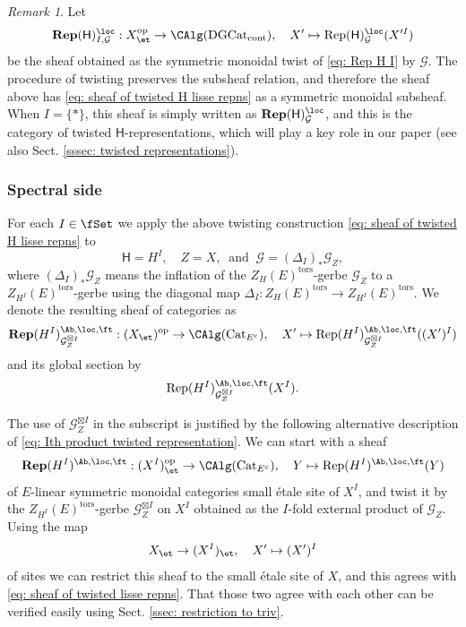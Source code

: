 \documentclass[10pt]{amsart}
\newcommand{\sssec}{\subsubsection}
\theoremstyle{remark}
\newtheorem{rmk}[subsubsection]{Remark}
\newcommand{\te}{\text}
\newcommand{\on}{\operatorname}
\newcommand{\cG}{\mathcal{G}}
\newcommand{\Cat}{\on{Cat}}
\newcommand{\CatEc}{\Cat_{E^c}}
\newcommand{\DGcat}{\on{DGCat}_{\on{cont}}}
\newcommand{\Rep}{\on{Rep}}
\DeclareMathOperator{\op}{op}
\begin{document}
\begin{rmk}\label{rmk: twisted Rep H containing twisted Rep H lisse}
    Let 
    \begin{equation*}
       \mathbf{Rep}(\mathsf{H})^{\loc}_{I,\cG}: X^{\op}_{\et}\rightarrow \CAlg(\DGcat),\quad X'\mapsto \Rep(\mathsf{H})^{\loc}_{\cG}(X'^I) 
    \end{equation*}
    be the sheaf obtained as the symmetric monoidal twist of \eqref{eq: Rep H I} by $\cG$.
    The procedure of twisting preserves the subsheaf relation, and therefore the sheaf above has \eqref{eq: sheaf of twisted H lisse repns} as a symmetric monoidal subsheaf. When $I=\{*\}$, this sheaf is simply written as $\mathbf{Rep}(\mathsf{H})^{\loc}_{\cG}$, and this is the category of twisted $\mathsf{H}$-representations, which will play a key role in our paper (see also Sect. \ref{sssec: twisted representations}).
\end{rmk}

\sssec{Spectral side}\label{sssec: B side of Satake}
For each $I\in\fSet$ we apply the above twisting construction \eqref{eq: sheaf of twisted H lisse repns} to
\[\mathsf{H}=H^I,\quad Z=X,\ \te{ and } \ \cG=(\Delta_I)_*\cG_Z,\]
 where $(\Delta_I)_*\cG_Z$ means the inflation of the $Z_H(E)^{\on{tors}}$-gerbe $\cG_Z$ to a $Z_{H^I}(E)^{\on{tors}}$-gerbe using the diagonal map $\Delta_I:Z_H(E)^{\on{tors}}\rightarrow Z_{H^I}(E)^{\on{tors}}$. We denote the resulting sheaf of categories as
\begin{equation}\label{eq: sheaf of twisted lisse repns}
\mathbf{Rep}(H^I)^{\Ab,\loc,\ft}_{\cG^{\boxtimes I}_Z}: (X_{\et})^{\op}\rightarrow \CAlg(\CatEc),\quad X'\mapsto \Rep(H^I)^{\Ab,\loc,\ft}_{\cG_Z^{\boxtimes I}}((X')^I)
\end{equation}
and its global section by 
\begin{equation}\label{eq: Ith product twisted representation}
    \Rep(H^I)^{\Ab,\loc,\ft}_{\cG^{\boxtimes I}_Z}(X^I).
\end{equation}

The use of $\cG^{\boxtimes I}_Z$ in the subscript is justified by the following alternative description of \eqref{eq: Ith product twisted representation}. We can start with a sheaf
\[\mathbf{Rep}(H^I)^{\Ab,\loc,\ft}:(X^I)^{\op}_{\et}\rightarrow \CAlg(\CatEc),\quad Y\mapsto \Rep(H^I)^{\Ab,\loc,\ft}(Y)\]
of $E$-linear symmetric monoidal categories small \'etale site of $X^I$, and twist it by the $Z_{H^I}(E)^{\on{tors}}$-gerbe $\cG^{\boxtimes I}_Z$ on $X^I$ obtained as the $I$-fold external product of $\cG_Z$. Using the map
\[X_{\et}\rightarrow (X^I)_{\et},\quad X'\mapsto (X')^I\]
of sites we can restrict this sheaf to the small \'etale site of $X$, and this agrees with \eqref{eq: sheaf of twisted lisse repns}. That those two agree with each other can be verified easily using Sect. \ref{ssec: restriction to triv}.
\end{document}
